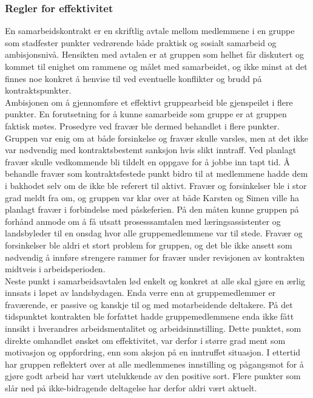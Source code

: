 \subsubsection{Regler for effektivitet}
En samarbeidskontrakt er en skriftlig avtale mellom medlemmene i en gruppe som stadfester punkter vedrørende både praktisk og sosialt samarbeid og ambisjonsnivå. 
Hensikten med avtalen er at gruppen som helhet får diskutert og kommet til enighet om rammene og målet med samarbeidet, og ikke minst at det finnes noe konkret å henvise til ved eventuelle konflikter og brudd på kontraktspunkter.\\

Ambisjonen om å gjennomføre et effektivt gruppearbeid ble gjenspeilet i flere punkter. 
En forutsetning for å kunne samarbeide som gruppe er at gruppen faktisk møtes. 
Prosedyre ved fravær ble dermed behandlet i flere punkter. 
Gruppen var enig om at både forsinkelse og fravær skulle varsles, men at det ikke var nødvendig med kontraktsbestemt sanksjon hvis slikt inntraff. 
Ved planlagt fravær skulle vedkommende bli tildelt en oppgave for å jobbe inn tapt tid. 
Å behandle fravær som kontraktsfestede punkt bidro til at medlemmene hadde dem i bakhodet selv om de ikke ble referert til aktivt.
Fravær og forsinkelser ble i stor grad meldt fra om, og gruppen var klar over at både Karsten og Simen ville ha planlagt fravær i forbindelse med påskeferien. 
På den måten kunne gruppen på forhånd anmode om å få utsatt prosesssamtalen med læringsassistenter og landsbyleder til en onsdag hvor alle gruppemedlemmene var til stede.
Fravær og forsinkelser ble aldri et stort problem for gruppen, og det ble ikke ansett som nødvendig å innføre strengere rammer for fravær under revisjonen av kontrakten midtveis i arbeidsperioden.\\

Neste punkt i samarbeidsavtalen lød enkelt og konkret at alle skal gjøre en ærlig innsats i løpet av landsbydagen.
Enda verre enn at gruppemedlemmer er fraværende, er passive og kanskje til og med motarbeidende deltakere.
På det tidspunktet kontrakten ble forfattet hadde gruppemedlemmene enda ikke fått innsikt i hverandres arbeidsmentalitet og arbeidsinnstilling.
Dette punktet, som direkte omhandlet ønsket om effektivitet, var derfor i større grad ment som motivasjon og oppfordring, enn som aksjon på en inntruffet situasjon.
I ettertid har gruppen reflektert over at alle medlemmenes innstilling og pågangsmot for å gjøre godt arbeid har vært utelukkende av den positive sort.
Flere punkter som slår ned på ikke-bidragende deltagelse har derfor aldri vært aktuelt.\\

